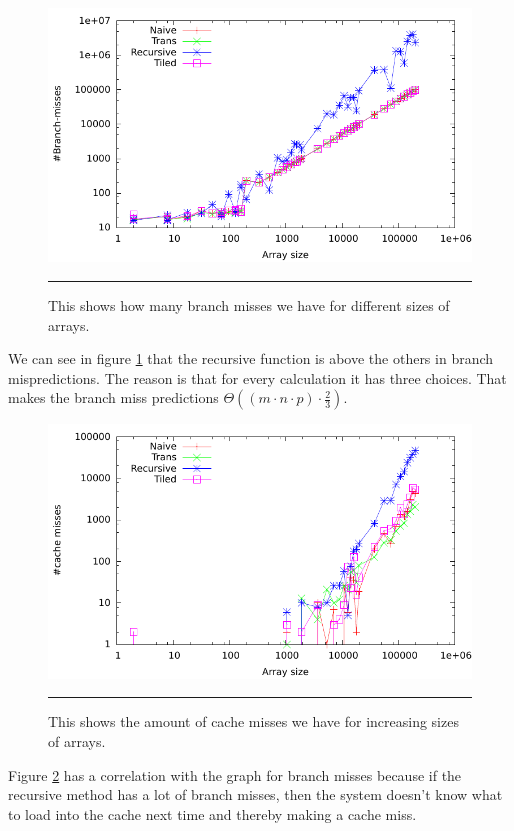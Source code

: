 \begin{figure}[htbp]
	\centering
		\includegraphics[width=\textwidth]{./Figures/Project2a/Branch_misses.pdf}
		\rule{35em}{0.5pt}
	\caption[Branch misses]{
	This shows how many branch misses we have for different sizes of arrays.
	}
	\label{fig:Branch_misses_p2a}
\end{figure}
We can see in figure \ref{fig:Branch_misses_p2a} that the recursive function is above the others in branch mispredictions.
The reason is that for every calculation it has three choices.
That makes the branch miss predictions $ \Theta ((m\cdot n\cdot p)\cdot \frac{2}{3}) $.

\begin{figure}[htbp]
	\centering
		\includegraphics[width=\textwidth]{./Figures/Project2a/Cache_misses.pdf}
		\rule{35em}{0.5pt}
	\caption[Cache misses]{
	This shows the amount of cache misses we have for increasing sizes of arrays.
	}
	\label{fig:Cache_misses_p2a}
\end{figure}
Figure \ref{fig:Cache_misses_p2a} has a correlation with the graph for branch misses because if the recursive method has a lot of branch misses, then the system doesn't know what to load into the cache next time and thereby making a cache miss.


